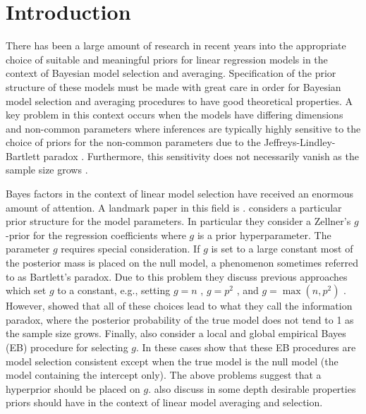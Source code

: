 \documentclass[12pt]{article}
\begin{document}
	\newpage
	
 


 
 
\section{Introduction}

There has been a large amount of research in recent years into the appropriate choice of suitable 
and meaningful priors for linear regression models in the context of Bayesian model selection and 
averaging. Specification of the prior structure of these models must be made with great care in 
order for Bayesian model selection and averaging procedures to have good theoretical properties. 
A key problem in this context occurs when the models have differing dimensions and non-common 
parameters where inferences are typically highly sensitive to the choice of priors for the 
non-common parameters due to the Jeffreys-Lindley-Bartlett paradox \citep{Lindley1957,Bartlett1957,OrmerodEtal2017}.
Furthermore, this sensitivity does not necessarily vanish as the sample size 
grows \citep{Kass1995,Berger2001}.  

Bayes factors in the context of linear model selection 
\citep{Zellner1980,
	Zellner1980b,
	Mitchell1988,
	George1993,
	Fernandez2001,
	Liang2008,
	Maruyama2011,
	Bayarri2012}
have received an 
enormous amount of attention. A landmark paper in this field is \cite{Liang2008}.
\cite{Liang2008} considers a particular prior structure for the model parameters. 
In particular they consider a Zellner's $g$-prior \citep{Zellner1980,Zellner1986} 
for the regression coefficients where $g$ is a prior hyperparameter. The parameter $g$
requires special consideration. If $g$ is set to a large constant most of the posterior
mass is placed on the null model, a phenomenon sometimes referred to as Bartlett's paradox.
Due to this problem they discuss previous approaches which set $g$ to a constant, e.g., setting $g=n$ \citep{Kass1995b},  $g=p^2$ \citep{Foster1994},
and $g=\max(n,p^2)$ \citep{Fernandez2001}. However, \cite{Liang2008} showed that 
all of these choices
lead to what they call the information paradox, where the posterior probability of the
true model does not tend to 1 as the sample size grows. Finally, \cite{Liang2008} also consider
a local and global empirical Bayes (EB) procedure for selecting $g$. In these cases \cite{Liang2008}
show that these EB procedures are model selection consistent except when the true model is the null
model (the model containing the intercept only). The above problems suggest that a hyperprior should
be placed on $g$. \cite{Bayarri2012} also discuss in some depth desirable properties
priors should have in the context of linear model averaging and selection. 
\end{document}
